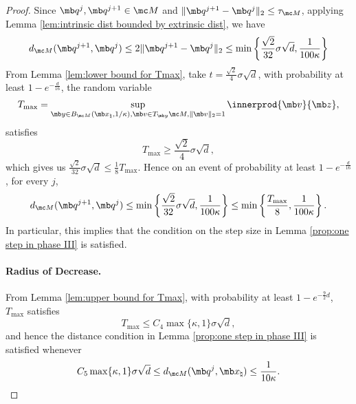 \begin{proof}
Since $\mb q^j, \mb q^{j+1} \in \mc M$ and $\|\mb q^{j+1}-\mb q^j \|_2 \leq \tau_{\mc M}$, applying Lemma \ref{lem:intrinsic dist bounded by extrinsic dist}, we have
\begin{equation}
     d_{\mc M}(\mb q^{j+1}, \mb q^j ) 
     \leq 2 \|\mb q^{j+1} - \mb q^j \|_2 
     \leq \min \left\{ \frac{\sqrt{2}}{32}\sigma \sqrt{d}, \frac{1}{100\kappa} \right\}
\end{equation}
From Lemma \ref{lem:lower bound for Tmax}, take $t=\frac{\sqrt{2}}{4} \sigma \sqrt{d}$, with probability at least $1-e^{-\frac{d}{16}}$, the random variable
\begin{equation}
    T_{\max} = \sup_{\mb y \in B_{\mc M}(\mb x_\natural, 1/\kappa), \mb v \in T_{\mb y } \mc M, \| \mb v \|_2 =1} \innerprod{\mb v}{\mb z},
\end{equation}
satisfies 
\begin{equation}
    T_{\max} \geq \frac{\sqrt{2}}{4} \sigma \sqrt{d},
\end{equation}
which gives us $\frac{\sqrt{2}}{32}\sigma \sqrt{d} \leq \frac{1}{8}T_{\max}$. Hence on an event of probability at least $1-e^{-\frac{d}{16}}$, for every $j$, 
\begin{equation}
    d_{\mc M}(\mb q^{j+1}, \mb q^j ) 
     \leq \min \left\{ \frac{\sqrt{2}}{32}\sigma \sqrt{d}, \frac{1}{100\kappa} \right\}
     \leq \min \left\{\frac{T_{\max}}{8}, \frac{1}{100\kappa}\right\}.
\end{equation}
In particular, this implies that the condition on the step size in Lemma \ref{prop:one step in phase III} is satisfied. 

\paragraph{Radius of Decrease.} From Lemma \ref{lem:upper bound for Tmax}, with probability at least $1 - e^{-\tfrac{9}{2} d}$, $T_{\max}$ satisfies 
\begin{equation}
T_{\max} \le C_4 \max\{ \kappa, 1 \} \sigma \sqrt{d}, 
\end{equation}
and hence the distance condition in Lemma \ref{prop:one step in phase III} is satisfied whenever 
\begin{equation}
    C_5 \max\{ \kappa, 1 \} \sigma \sqrt{d} \le d_{\mc M}(\mb q^j, \mb x_\natural ) \le \frac{1}{10\kappa}. 
\end{equation}


\end{proof}
